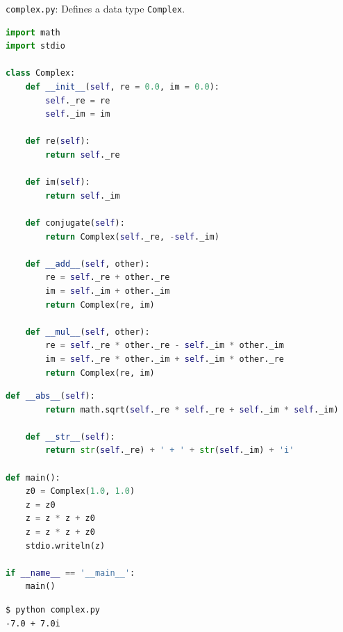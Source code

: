 \documentclass[8pt,a4paper,compress,handout]{beamer}
\begin{document}
\begin{frame}[fragile]
\begin{framed}
\tiny \lstinline{complex.py}: Defines a data type \lstinline{Complex}.
\end{framed}

\begin{lstlisting}[language=Python]
import math
import stdio

class Complex:
    def __init__(self, re = 0.0, im = 0.0):
        self._re = re
        self._im = im

    def re(self):
        return self._re

    def im(self):
        return self._im

    def conjugate(self):
        return Complex(self._re, -self._im)

    def __add__(self, other):
        re = self._re + other._re
        im = self._im + other._im
        return Complex(re, im)

    def __mul__(self, other):
        re = self._re * other._re - self._im * other._im
        im = self._re * other._im + self._im * other._re
        return Complex(re, im)
\end{lstlisting}
\end{frame}

\begin{frame}[fragile]
\begin{lstlisting}[language=Python]
    def __abs__(self):
        return math.sqrt(self._re * self._re + self._im * self._im)

    def __str__(self):
        return str(self._re) + ' + ' + str(self._im) + 'i'

def main():
    z0 = Complex(1.0, 1.0)
    z = z0
    z = z * z + z0
    z = z * z + z0
    stdio.writeln(z)

if __name__ == '__main__':
    main()
\end{lstlisting}

\begin{lstlisting}[language={}]
$ python complex.py 
-7.0 + 7.0i
\end{lstlisting}
\end{frame}
\end{document}
